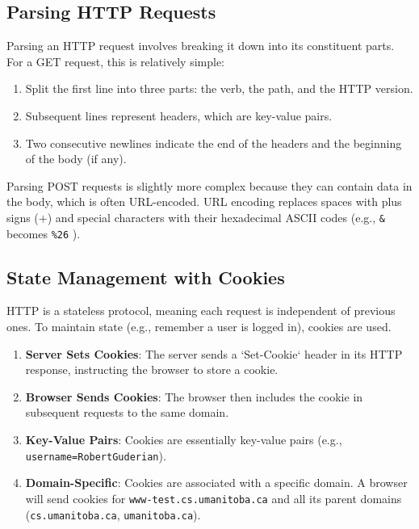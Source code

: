 \subsection{Parsing HTTP Requests}

Parsing an HTTP request involves breaking it down into its constituent parts.  For a GET request, this is relatively simple:

\begin{enumerate}[noitemsep, itemsep=1pt]
    \item Split the first line into three parts: the verb, the path, and the HTTP version.
    \item Subsequent lines represent headers, which are key-value pairs.
    \item  Two consecutive newlines indicate the end of the headers and the beginning of the body (if any).
\end{enumerate}

Parsing POST requests is slightly more complex because they can contain data in the body, which is often URL-encoded. URL encoding replaces spaces with plus signs ($+$) and special characters with their hexadecimal ASCII codes (e.g., \texttt{\&}  becomes \texttt{\%26} ).

\subsection{State Management with Cookies}
HTTP is a stateless protocol, meaning each request is independent of previous ones.  To maintain state (e.g., remember a user is logged in), cookies are used.

\begin{enumerate}[label=\roman*), itemsep=1pt]
    \item \textbf{Server Sets Cookies}:  The server sends a `Set-Cookie` header in its HTTP response, instructing the browser to store a cookie.
    \item \textbf{Browser Sends Cookies}:  The browser then includes the cookie in subsequent requests to the same domain.
    \item \textbf{Key-Value Pairs}: Cookies are essentially key-value pairs (e.g., \texttt{username=RobertGuderian}).
    \item \textbf{Domain-Specific}: Cookies are associated with a specific domain.  A browser will send cookies for \texttt{www-test.cs.umanitoba.ca} and all its parent domains (\texttt{cs.umanitoba.ca}, \texttt{umanitoba.ca}).
\end{enumerate}

